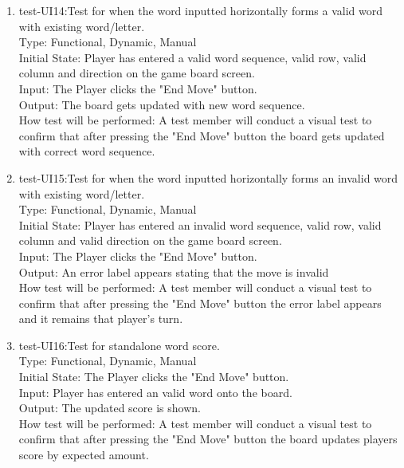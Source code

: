\documentclass[12pt, titlepage]{article}
\begin{document}
\begin{enumerate}
    \item{test-UI14:Test for when the word inputted horizontally forms a valid word with existing word/letter.\\} %
    Type: Functional, Dynamic, Manual\\
    Initial State: Player has entered a valid word sequence, valid row, valid column and direction on the game board screen.\\
    Input: The Player clicks the "End Move" button.\\
    Output: The board gets updated with new word sequence. \\
    How test will be performed: A test member will conduct a visual test to confirm that after pressing the "End Move" button the board gets updated with correct word sequence.\\
    
    \item{test-UI15:Test for when the word inputted horizontally forms an invalid word with existing word/letter.\\} %
    Type: Functional, Dynamic, Manual\\
    Initial State: Player has entered an invalid word sequence, valid row, valid column and valid direction on the game board screen.\\
    Input: The Player clicks the "End Move" button.\\
    Output: An error label appears stating that the move is invalid \\
    How test will be performed: A test member will conduct a visual test to confirm that after pressing the "End Move" button the error label appears and it remains that player's turn.\\
    
    \item{test-UI16:Test for standalone word score.\\} %
    Type: Functional, Dynamic, Manual\\
    Initial State: The Player clicks the "End Move" button.\\
    Input: Player has entered an valid word onto the board. \\
    Output: The updated score is shown. \\
    How test will be performed: A test member will conduct a visual test to confirm that after pressing the "End Move" button the board updates players score by expected amount.\\
    

\end{enumerate}
\end{document}
